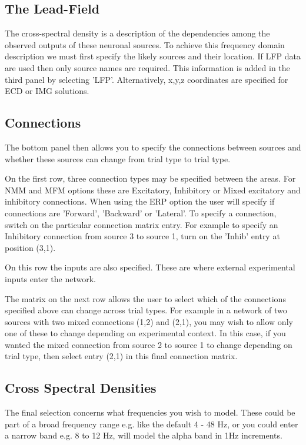 \subsection{The Lead-Field}
The cross-spectral density is a description of the dependencies among the observed outputs of these neuronal sources. To achieve this frequency domain description we must first specify the likely sources and their location. If LFP data are used then only source names are required. This information is added in the third panel by selecting 'LFP'. Alternatively, x,y,z coordinates are specified for ECD or IMG solutions.


\subsection{Connections}
The bottom panel then allows you to specify the connections between sources and whether these sources can change from trial type to trial type.

On the first row, three connection types may be specified between the areas. For NMM and MFM options these are Excitatory, Inhibitory or Mixed excitatory and inhibitory connections. When using the ERP option the user will specify if connections are 'Forward', 'Backward' or 'Lateral'. To specify a connection, switch on the particular connection matrix entry. For example to specify an Inhibitory connection from source 3 to source 1, turn on the 'Inhib' entry at position (3,1).

On this row the inputs are also specified. These are where external experimental inputs enter the network.

The matrix on the next row allows the user to select which of the connections specified above can change across trial types. For example in a network of two sources with two mixed connections (1,2) and (2,1), you may wish to allow only one of these to change depending on experimental context. In this case, if you wanted the mixed connection from source 2 to source 1 to change depending on trial type, then select entry (2,1) in this final connection matrix.


\subsection{Cross Spectral Densities}
The final selection concerns what frequencies you wish to model. These could be part of a broad frequency range e.g. like the default 4 - 48 Hz, or you could enter a narrow band e.g. 8 to 12 Hz, will model the alpha band in 1Hz increments.

